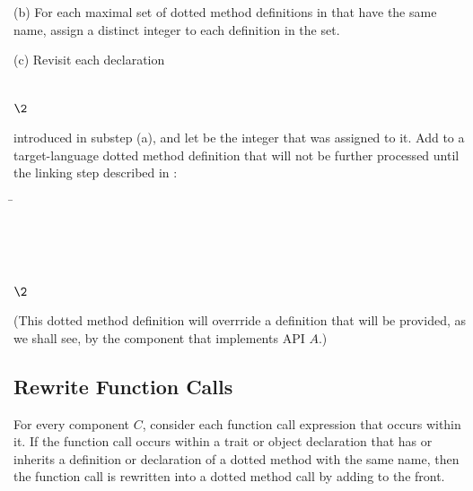 (b) For each maximal set of
dotted method definitions in  that have the same name, assign a
distinct integer to each definition in the set.

(c) Revisit each declaration
\begin{codeexamplesize}
\begin{tabbing}
 \\
\(\2\)
\end{tabbing}
\end{codeexamplesize}
introduced in substep (a), and let  be the integer that was assigned to it.
Add to  a target-language dotted method definition that will not be further processed
until the linking step described in :
\begin{codeexamplesize}
\begin{tabbing}
\= \\
\>                   \\
\>                   \\
\>                  \EXP{\ldots,} \\
\>                   \\
\(\2\)
\end{tabbing}
\end{codeexamplesize}
(This dotted method definition will overrride a definition that will be provided,
as we shall see, by the component that implements API $A$.)


\subsection{Rewrite Function Calls}

For every component $C$, consider each function call expression
that occurs within it.  If the function call occurs within a trait
or object declaration that has or inherits a definition or declaration
of a dotted method with the same name, then the function call
is rewritten into a dotted method call by adding  to the front.

